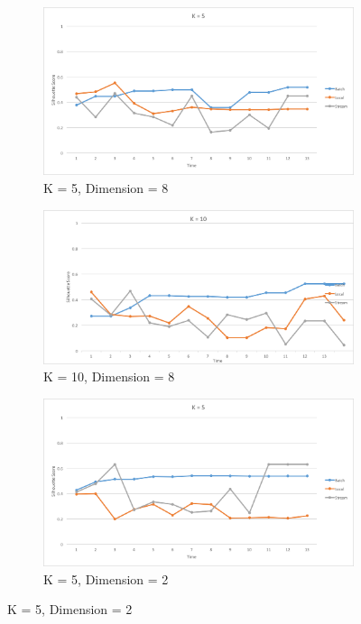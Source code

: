 \documentclass{lmproj}
\begin{document}
\begin{figure}[H]
	\begin{subfigure}{.5\textwidth}
		\centering
		\includegraphics[width=.8\linewidth]{silhouette/silhouette_0_100_k_5_dim_8}
		\caption*{K = 5, Dimension = 8}
		\label{fig:silhouette_0_100_k_5_dim_8}
	\end{subfigure}%
	\begin{subfigure}{.5\textwidth}
		\centering
		\includegraphics[width=.8\linewidth]{silhouette/silhouette_0_100_k_10_dim_8}
		\caption*{K = 10, Dimension = 8}
		\label{fig:silhouette_0_100_k_10_dim_8}
	\end{subfigure}
	\begin{subfigure}{.5\textwidth}
		\centering
		\includegraphics[width=.8\linewidth]{silhouette/silhouette_0_100_k_5_dim_2}
		\caption*{K = 5, Dimension = 2}
		\label{fig:silhouette_0_100_k_5_dim_2}
	\end{subfigure}%

\end{figure}
\end{document}
